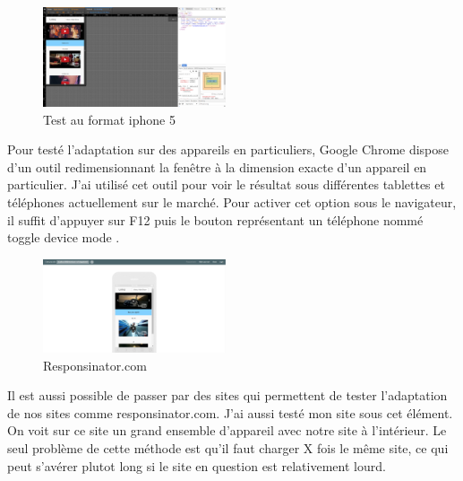 \documentclass{article}
\begin{document}
\begin{figure}
  \vspace{-25pt}
  \begin{center}
    \includegraphics[width=0.48\textwidth]{p16}
  \end{center}
  \vspace{-20pt}
  \caption{Test au format iphone 5}
  \vspace{-10pt}
\end{figure}

Pour test\'e l'adaptation sur des appareils en particuliers, Google Chrome dispose d'un outil redimensionnant la fen\^etre \`a la dimension exacte d'un appareil en particulier. J'ai utilis\'e cet outil pour voir le r\'esultat sous diff\'erentes tablettes et t\'el\'ephones actuellement sur le march\'e. Pour activer cet option sous le navigateur, il suffit d'appuyer sur F12 puis le bouton repr\'esentant un t\'el\'ephone nomm\'e \og toggle device mode \fg{}.
\vspace{0.5cm}\\
\begin{figure}
  \vspace{-25pt}
  \begin{center}
    \includegraphics[width=0.48\textwidth]{p17}
  \end{center}
  \vspace{-20pt}
  \caption{Responsinator.com}
  \vspace{-10pt}
\end{figure} 

Il est aussi possible de passer par des sites qui permettent de tester l'adaptation de nos sites comme responsinator.com. J'ai aussi test\'e mon site sous cet \'el\'ement. On voit sur ce site un grand ensemble d'appareil avec notre site \`a l'int\'erieur. Le seul probl\`eme de cette m\'ethode est qu'il faut charger X fois le m\^eme site, ce qui peut s'av\'erer plutot long si le site en question est relativement lourd.\\
\end{document}

